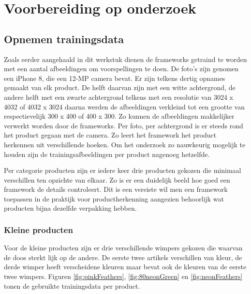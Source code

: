 
\chapter{Voorbereiding op onderzoek}
\label{ch:Voorbereiding op onderzoek}

\section{Opnemen trainingsdata}
\label{sec:Opnemen trainingsdata}

Zoals eerder aangehaald in dit werkstuk dienen de frameworks getraind te worden met een aantal afbeeldingen om voorspellingen te doen. De foto’s zijn genomen een iPhone 8, die een 12-MP camera bevat. Er zijn telkens dertig opnames gemaakt van elk product. De helft daarvan zijn met een witte achtergrond, de andere helft met een zwarte achtergrond telkens met een resolutie van 3024 x 4032 of 4032 x 3024 daarna werden de afbeeldingen verkleind tot een grootte van respectievelijk 300 x 400 of 400 x 300. Zo kunnen de afbeeldingen makkelijker verwerkt worden door de frameworks. Per foto, per achtergrond is er steeds rond het product gegaan met de camera. Zo leert het framework het product herkennen uit verschillende hoeken. Om het onderzoek zo nauwkeurig mogelijk te houden zijn de trainingsafbeeldingen per product nagenoeg hetzelfde. 

Per categorie producten zijn er iedere keer drie producten gekozen die minimaal verschillen ten opzichte van elkaar. Zo is er een duidelijk beeld hoe goed een framework de details controleert. Dit is een vereiste wil men een framework toepassen in de praktijk voor productherkenning aangezien behoorlijk wat producten bijna dezelfde verpakking hebben.

\subsection{Kleine producten}
\label{ssec:Kleine producten}

Voor de kleine producten zijn er drie verschillende wimpers gekozen die waarvan de doos sterkt lijk op de andere. De eerste twee artikels verschillen van kleur, de derde wimper heeft verscheidene kleuren maar bevat ook de kleuren van de eerste twee wimpers.
Figuren \ref{fig:pinkFeathers}, \ref{fig:80neonGreen} en \ref{fig:neonFeathers} tonen de gebruikte trainingsdata per product.

